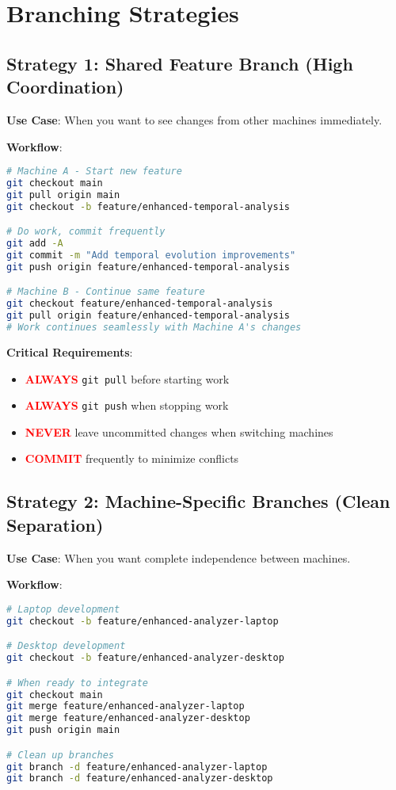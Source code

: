 \documentclass[11pt,letterpaper]{article}
\begin{document}
\section{Branching Strategies}

\subsection{Strategy 1: Shared Feature Branch (High Coordination)}

\textbf{Use Case}: When you want to see changes from other machines immediately.

\textbf{Workflow}:
\begin{lstlisting}[language=bash]
# Machine A - Start new feature
git checkout main
git pull origin main
git checkout -b feature/enhanced-temporal-analysis

# Do work, commit frequently
git add -A
git commit -m "Add temporal evolution improvements"
git push origin feature/enhanced-temporal-analysis

# Machine B - Continue same feature
git checkout feature/enhanced-temporal-analysis
git pull origin feature/enhanced-temporal-analysis
# Work continues seamlessly with Machine A's changes
\end{lstlisting}

\textbf{Critical Requirements}:
\begin{itemize}[label=\textbullet]
    \item \textcolor{red}{\textbf{ALWAYS}} \texttt{git pull} before starting work
    \item \textcolor{red}{\textbf{ALWAYS}} \texttt{git push} when stopping work
    \item \textcolor{red}{\textbf{NEVER}} leave uncommitted changes when switching machines
    \item \textcolor{red}{\textbf{COMMIT}} frequently to minimize conflicts
\end{itemize}

\subsection{Strategy 2: Machine-Specific Branches (Clean Separation)}

\textbf{Use Case}: When you want complete independence between machines.

\textbf{Workflow}:
\begin{lstlisting}[language=bash]
# Laptop development
git checkout -b feature/enhanced-analyzer-laptop

# Desktop development  
git checkout -b feature/enhanced-analyzer-desktop

# When ready to integrate
git checkout main
git merge feature/enhanced-analyzer-laptop
git merge feature/enhanced-analyzer-desktop
git push origin main

# Clean up branches
git branch -d feature/enhanced-analyzer-laptop
git branch -d feature/enhanced-analyzer-desktop
\end{lstlisting}
\end{document}
